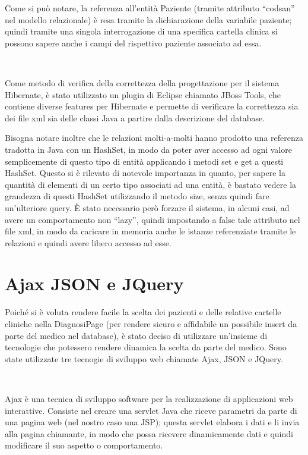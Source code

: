 \documentclass[a4paper,titlepage]{article}
\begin{document}
Come si può notare, la referenza all'entità Paziente (tramite attributo ``codsan'' nel modello relazionale) è resa tramite la dichiarazione della variabile paziente; quindi tramite una singola interrogazione di una specifica cartella clinica si possono sapere anche i campi del rispettivo paziente associato ad essa.

~

Come metodo di verifica della correttezza della progettazione per il sistema Hibernate, è stato utilizzato un plugin di Eclipse chiamato JBoss Tools, che contiene diverse features per Hibernate e permette di verificare la correttezza sia dei file xml sia delle classi Java a partire dalla descrizione del database.

Bisogna notare inoltre che le relazioni molti-a-molti hanno prodotto una referenza tradotta in Java con un HashSet, in modo da poter aver accesso ad ogni valore semplicemente di questo tipo di entità applicando i metodi set e get a questi HashSet. Questo si è rilevato di notevole importanza in quanto, per sapere la quantità di elementi di un certo tipo associati ad una entità, è bastato vedere la grandezza di questi HashSet utilizzando il metodo size, senza quindi fare un'ulteriore query. È stato necessario però forzare il sistema, in alcuni casi, ad avere un comportamento non ``lazy'', quindi impostando a false tale attributo nel file xml, in modo da caricare in memoria anche le istanze referenziate tramite le relazioni e quindi avere libero accesso ad esse. 

\section{Ajax JSON e JQuery}

Poiché si è voluta rendere facile la scelta dei pazienti e delle relative cartelle cliniche nella DiagnosiPage (per rendere sicuro e affidabile un possibile insert da parte del medico nel database), è stato deciso di utilizzare un'insieme di tecnologie che potessero rendere dinamica la scelta da parte del medico. Sono state utilizzate tre tecnogie di sviluppo web chiamate Ajax, JSON e JQuery.

~

Ajax è una tecnica di sviluppo software per la realizzazione di applicazioni web interattive. Consiste nel creare una servlet Java che riceve parametri da parte di una pagina web (nel nostro caso una JSP); questa servlet elabora i dati e li invia alla pagina chiamante, in modo che possa ricevere dinamicamente dati e quindi modificare il suo aspetto o comportamento.
\end{document}
